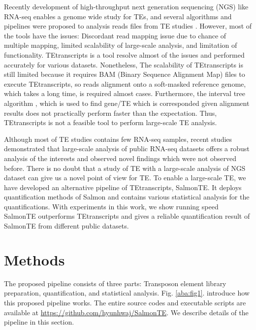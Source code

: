 \documentclass{ws-procs11x85}
\begin{document}
Recently development of high-throughput next generation sequencing (NGS) like RNA-seq
enables a genome wide study for TEs\cite{ohtani2013dmgtsf1,mihevc2016tdp,li2012transposable,krug2017retrotransposon}, and several algorithms and pipelines were proposed to analysis reads files from TE studies \cite{lee2012landscape,platzer2012te,helman2014somatic,henaff2015jitterbug,jin2015tetranscripts,de2017identifying}. However, most of the tools have the issues: Discordant read mapping issue due to chance of multiple mapping, limited scalability of large-scale analysis, and limitation of functionality. \cite{ewing2015transposable} TEtranscripts is a tool resolve almost of the issues and performed accurately for various datasets. 
Nonetheless, The scalability of TEtranscripts is still limited because it requires BAM (Binary Sequence Alignment Map) files to execute TEtranscripts, so reads alignment onto a soft-masked reference genome, which takes a long time, is required almost cases. Furthermore, the interval tree algorithm \cite{samet1990design}, which is used to find gene/TE which is corresponded given alignment results does not practically perform faster than the expectation. Thus, TEtranscripts is not a feasible tool to perform large-scale TE analysis.

Although most of TE studies contains few RNA-seq samples,  recent studies demonstrated that large-scale analysis of public RNA-seq 
datasets offers a robust analysis of the interests and observed novel 
findings which were not observed before. \cite{nellore2016human} There is no doubt that a study of TE with a large-scale analysis of NGS dataset can give us a novel point of view for TE. To enable a large-scale TE, we have developed an alternative pipeline of TEtranscripts, SalmonTE. It deploys quantification methods of Salmon\cite{patro2017salmon} and contains various statistical analysis for the quantifications. With experiments in this work, we show running speed SalmonTE outperforms TEtranscripts and gives a reliable quantification result of SalmonTE from different public datasets.

\section{Methods}

The proposed pipeline consists of three parts: Transposon element library preparation, quantification, and statistical analysis. Fig. \ref{aba:fig1}. introduce how this proposed pipeline works.
The entire source codes and executable scripts are available at \url{https://github.com/hyunhwaj/SalmonTE}. We describe details of the pipeline in this section. 
\end{document}
